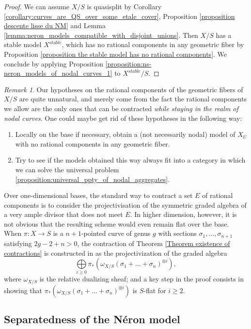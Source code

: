 \documentclass[a4paper,10pt,twoside]{article}
\theoremstyle{definition}
\theoremstyle{remark}
\newtheorem{rem}{Remark}[thm]
\begin{document}
\begin{proof}
We can assume $X/S$ is quasisplit by Corollary \ref{corollary:curves_are_QS_over_some_etale_cover}, Proposition \ref{proposition descente lisse du NM} and Lemma \ref{lemma:neron_models_compatible_with_disjoint_unions}. Then $X/S$ has a stable model $X^{stable}$, which has no rational components in any geometric fiber by Proposition \ref{proposition the stable model has no rational components}. We conclude by applying Proposition \ref{proposition:ns-neron_models_of_nodal_curves_1} to $X^{stable}/S$.
\end{proof}

\begin{rem}
Our hypotheses on the rational components of the geometric fibers of $X/S$ are quite unnatural, and merely come from the fact the rational components we allow are the only ones that can be contracted \emph{while staying in the realm of nodal curves}. One could maybe get rid of these hypotheses in the following way:
\begin{enumerate}
\item Locally on the base if necessary, obtain a (not necessarily nodal) model of $X_U$ with no rational components in any geometric fiber.
\item Try to see if the models obtained this way always fit into a category in which we can solve the universal problem \ref{proposition:universal_ppty_of_nodal_aggregates}.
\end{enumerate}
Over one-dimensional bases, the standard way to contract a set $E$ of rational components is to consider the projectivisation of the symmetric graded algebra of a very ample divisor that does not meet $E$. In higher dimension, however, it is not obvious that the resulting scheme would even remain flat over the base. When $\pi\colon X \to S$ is a $n+1$-pointed curve of genus $g$ with sections $\sigma_1,...,\sigma_{n+1}$ satisfying $2g-2+n>0$, the contraction of Theorem \ref{Theorem existence of contractions} is constructed in \cite{Knudsen} as the projectivization of the graded algebra
\[
\bigoplus\limits_{i\geq 0}\pi_*(\omega_{X/S}(\sigma_1+...+\sigma_n)^{\otimes i}),
\]
where $\omega_{X/S}$ is the relative dualizing sheaf; and a key step in the proof consists in showing that $\pi_*(\omega_{X/S}(\sigma_1+...+\sigma_n)^{\otimes i})$ is $S$-flat for $i\geq 2$.
\end{rem}

\subsection{Separatedness of the N\'eron model}
\end{document}
